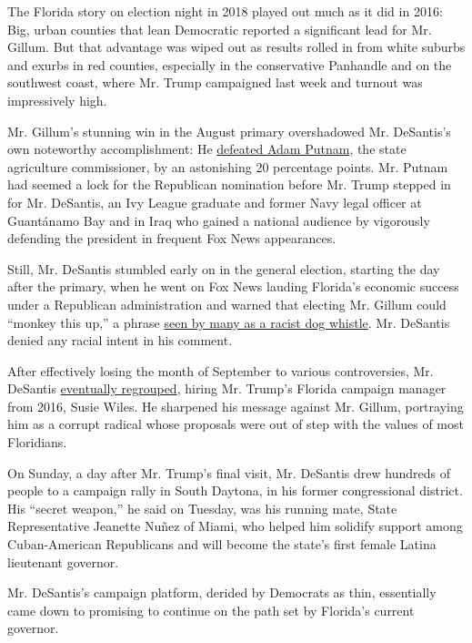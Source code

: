 The Florida story on election night in 2018 played out much as it did in
2016: Big, urban counties that lean Democratic reported a significant
lead for Mr. Gillum. But that advantage was wiped out as results rolled
in from white suburbs and exurbs in red counties, especially in the
conservative Panhandle and on the southwest coast, where Mr. Trump
campaigned last week and turnout was impressively high.

Mr. Gillum's stunning win in the August primary overshadowed Mr.
DeSantis's own noteworthy accomplishment: He
\href{https://www.nytimes.com/2018/08/28/us/politics/florida-arizona-election-results.html}{defeated
Adam Putnam}, the state agriculture commissioner, by an astonishing 20
percentage points. Mr. Putnam had seemed a lock for the Republican
nomination before Mr. Trump stepped in for Mr. DeSantis, an Ivy League
graduate and former Navy legal officer at Guantánamo Bay and in Iraq who
gained a national audience by vigorously defending the president in
frequent Fox News appearances.

Still, Mr. DeSantis stumbled early on in the general election, starting
the day after the primary, when he went on Fox News lauding Florida's
economic success under a Republican administration and warned that
electing Mr. Gillum could ``monkey this up,'' a phrase
\href{https://www.nytimes.com/2018/08/29/us/politics/desantis-monkey-up-gillum.html}{seen
by many as a racist dog whistle}. Mr. DeSantis denied any racial intent
in his comment.

After effectively losing the month of September to various
controversies, Mr. DeSantis
\href{https://www.nytimes.com/2018/10/04/us/politics/florida-desantis-governor.html}{eventually
regrouped}, hiring Mr. Trump's Florida campaign manager from 2016, Susie
Wiles. He sharpened his message against Mr. Gillum, portraying him as a
corrupt radical whose proposals were out of step with the values of most
Floridians.

On Sunday, a day after Mr. Trump's final visit, Mr. DeSantis drew
hundreds of people to a campaign rally in South Daytona, in his former
congressional district. His ``secret weapon,'' he said on Tuesday, was
his running mate, State Representative Jeanette Nuñez of Miami, who
helped him solidify support among Cuban-American Republicans and will
become the state's first female Latina lieutenant governor.

Mr. DeSantis's campaign platform, derided by Democrats as thin,
essentially came down to promising to continue on the path set by
Florida's current governor.

